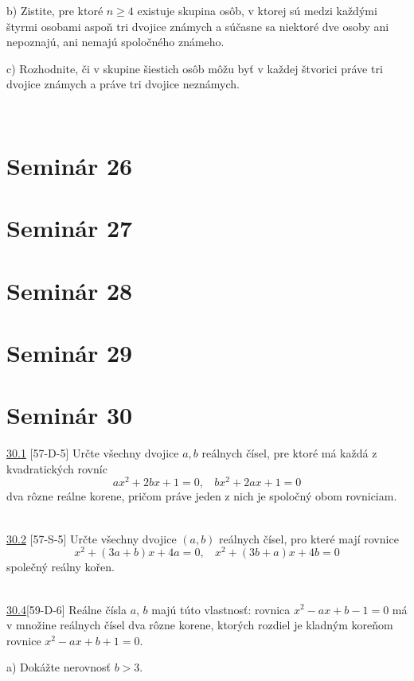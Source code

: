 b) Zistite, pre ktoré $n \geq 4$ existuje skupina osôb, v ktorej sú medzi každými štyrmi osobami aspoň tri dvojice známych a súčasne sa niektoré dve osoby ani nepoznajú, ani nemajú spoločného známeho.

c) Rozhodnite, či v skupine šiestich osôb môžu byť v každej štvorici práve tri dvojice známych a práve tri dvojice neznámych.


\\

\section*{Seminár 26}

\section*{Seminár 27}

\section*{Seminár 28}

\section*{Seminár 29}

\section*{Seminár 30}

\noindent \ul{30.1} [57-D-5] \ToDo Určte všechny dvojice $a, b$ reálnych čísel, pre ktoré má každá z
kvadratických rovníc
$$ax^2 + 2bx + 1 = 0, \ \ \ \ bx^2 + 2ax + 1 = 0$$
dva rôzne reálne korene, pričom práve jeden z nich je spoločný obom rovniciam.


\\

\noindent \ul{30.2} [57-S-5] \ToDo
Určte všechny dvojice $(a, b)$ reálnych čísel, pro které mají rovnice
$$x^2 + (3a + b)x + 4a = 0, \ \ \ \  x^2 + (3b + a)x + 4b = 0$$
společný reálny kořen.


\\

\noindent \ul{30.4}[59-D-6] Reálne čísla $a$, $b$ majú túto vlastnosť: rovnica $x^2 -ax+b-1 = 0$ má v množine reálnych čísel dva rôzne korene, ktorých rozdiel je kladným koreňom rovnice $x^2 - ax + b + 1 = 0$.

a) Dokážte nerovnosť $b > 3$.

